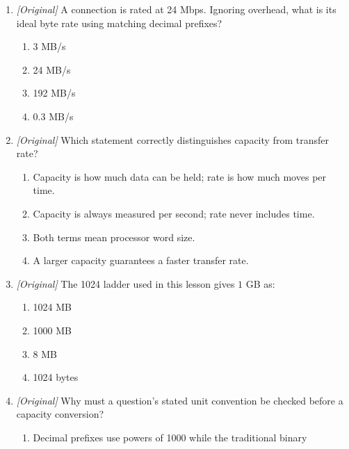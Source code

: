 \documentclass[11pt]{article}
\begin{document}
\begin{enumerate}[label=\textbf{Q\arabic*.}, leftmargin=*]
\begin{enumerate}[label=\Roman*.]
    \item A byte is 8 bits.
    \item A byte is two nibbles.
  \end{enumerate}
  \begin{enumerate}[label=\Alph*.]
    \item I only
    \item I and II only
    \item II and III only
    \item I, II, and III
  \end{enumerate}
\item \textit{[Original]} A connection is rated at 24 Mbps. Ignoring
  overhead, what is its ideal byte rate using matching decimal prefixes?
  \begin{enumerate}[label=\Alph*.]
    \item 3 MB/s
    \item 24 MB/s
    \item 192 MB/s
    \item 0.3 MB/s
  \end{enumerate}
\item \textit{[Original]} Which statement correctly distinguishes capacity
  from transfer rate?
  \begin{enumerate}[label=\Alph*.]
    \item Capacity is how much data can be held; rate is how much moves per
      time.
    \item Capacity is always measured per second; rate never includes time.
    \item Both terms mean processor word size.
    \item A larger capacity guarantees a faster transfer rate.
  \end{enumerate}
\item \textit{[Original]} The 1024 ladder used in this lesson gives
  $1$ GB as:
  \begin{enumerate}[label=\Alph*.]
    \item 1024 MB
    \item 1000 MB
    \item 8 MB
    \item 1024 bytes
  \end{enumerate}
\item \textit{[Original]} Why must a question's stated unit convention be
  checked before a capacity conversion?
  \begin{enumerate}[label=\Alph*.]
    \item Decimal prefixes use powers of 1000 while the traditional binary

\end{enumerate}
\end{enumerate}
\end{document}
